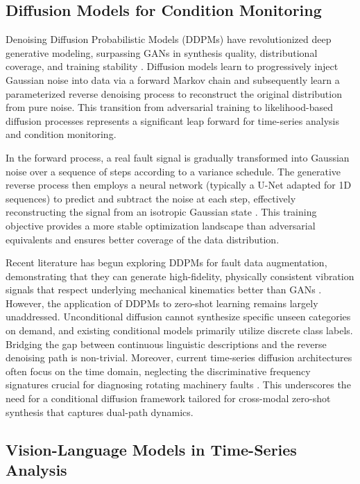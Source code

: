 \subsection{Diffusion Models for Condition Monitoring}

Denoising Diffusion Probabilistic Models (DDPMs) have revolutionized deep generative modeling, surpassing GANs in synthesis quality, distributional coverage, and training stability \cite{ho2020denoising}. Diffusion models learn to progressively inject Gaussian noise into data via a forward Markov chain and subsequently learn a parameterized reverse denoising process to reconstruct the original distribution from pure noise. This transition from adversarial training to likelihood-based diffusion processes represents a significant leap forward for time-series analysis and condition monitoring.

In the forward process, a real fault signal is gradually transformed into Gaussian noise over a sequence of steps according to a variance schedule. The generative reverse process then employs a neural network (typically a U-Net adapted for 1D sequences) to predict and subtract the noise at each step, effectively reconstructing the signal from an isotropic Gaussian state \cite{he2016deep,ho2020denoising}. This training objective provides a more stable optimization landscape than adversarial equivalents and ensures better coverage of the data distribution.

Recent literature has begun exploring DDPMs for fault data augmentation, demonstrating that they can generate high-fidelity, physically consistent vibration signals that respect underlying mechanical kinematics better than GANs \cite{fan2025lightweight,yang2024novel}. However, the application of DDPMs to zero-shot learning remains largely unaddressed. Unconditional diffusion cannot synthesize specific unseen categories on demand, and existing conditional models primarily utilize discrete class labels. Bridging the gap between continuous linguistic descriptions and the reverse denoising path is non-trivial. Moreover, current time-series diffusion architectures often focus on the time domain, neglecting the discriminative frequency signatures crucial for diagnosing rotating machinery faults \cite{guo2025bearing}. This underscores the need for a conditional diffusion framework tailored for cross-modal zero-shot synthesis that captures dual-path dynamics.

\subsection{Vision-Language Models in Time-Series Analysis}

